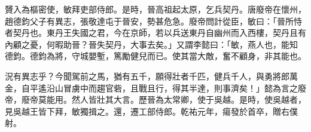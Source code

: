 \begin{pinyinscope}
 贇入為樞密使，敏拜吏部侍郎。是時，晉高祖起太原，乞兵契丹。唐廢帝在懷州，趙德鈞父子有異志，張敬達屯于晉安，勢甚危急。廢帝問計從臣，敏曰：「晉所恃者契丹也。東丹王失國之君，今在京師，若以兵送東丹自幽州而入西樓，契丹且有內顧之憂，何暇助晉？晉失契丹，大事去矣。」又謂李懿曰：「敏，燕人也，能知
 德鈞。德鈞為將，守城嬰塹，篤勵健兒而已。使其當大敵，奮不顧身，非其能也。



 況有異志乎？今聞駕前之馬，猶有五千，願得壯者千匹，健兵千人，與勇將郎萬金，自平遙沿山冒虜中而趨官砦，且戰且行，得其半達，則事濟矣！」懿為言之廢帝，廢帝莫能用。然人皆壯其大言。歷晉為太常卿，使于吳越。是時，使吳越者，見吳越王皆下拜，敏獨揖之。還，遷工部侍郎。乾祐元年，瘍發於首卒，贈右僕射。



\end{pinyinscope}